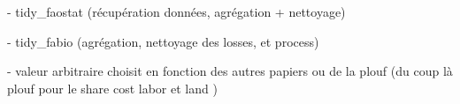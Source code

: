 - tidy\_faostat (récupération données, agrégation + nettoyage)

- tidy\_fabio (agrégation, nettoyage des losses, et process)

- valeur arbitraire choisit en fonction des autres papiers ou de la plouf (du coup là plouf pour le share cost labor et land )
